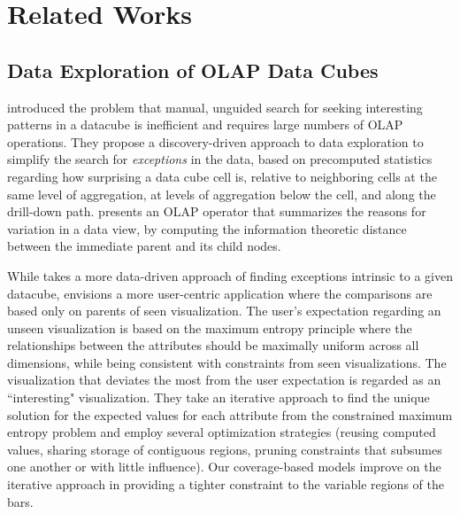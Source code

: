 \section{Related Works}
\subsection{Data Exploration of OLAP Data Cubes}
 introduced the problem that manual, unguided search for seeking interesting patterns in a datacube is inefficient and requires large numbers of OLAP operations. They propose a discovery-driven approach to data exploration to simplify the search for \textit{exceptions} in the data, based on precomputed statistics regarding how surprising a data cube cell is, relative to neighboring cells at the same level of aggregation, at levels of aggregation below the cell, and along the drill-down path.   presents an OLAP operator that summarizes the reasons for variation in a data view, by computing the information theoretic distance between the immediate parent and its child nodes.
\par While  takes a more data-driven approach of finding exceptions intrinsic to a given datacube,   envisions a more user-centric application where the comparisons are based only on parents of seen visualization. The user's expectation regarding an unseen visualization is based on the maximum entropy principle where the relationships between the attributes should be maximally uniform across all dimensions, while being consistent with constraints from seen visualizations. The visualization that deviates the most from the user expectation is regarded as an ``interesting" visualization. They take an iterative approach to find the unique solution for the expected values for each attribute from the constrained maximum entropy problem and employ several optimization strategies (reusing computed values, sharing storage of contiguous regions, pruning constraints that subsumes one another or with little influence). Our coverage-based models improve on the iterative approach in providing a tighter constraint to the variable regions of the bars.
